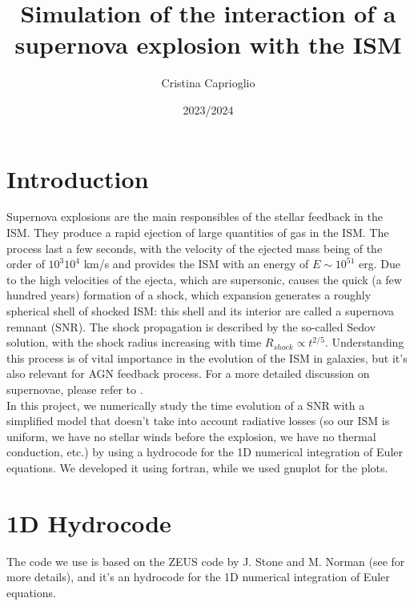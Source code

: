 \documentclass{article}
\title{Simulation of the interaction of a supernova explosion with the ISM}
\author{Cristina Caprioglio}
\date{2023/2024 }
\begin{document}
\maketitle

\section*{Introduction}
Supernova explosions are the main responsibles of the stellar feedback in the ISM. They produce a rapid ejection of large quantities of gas in the ISM. The process last a few seconds, with the velocity of the ejected mass being of the order of $10^{3}$\textemdash$10^{4}$ km/s and provides the ISM with an energy of $E\sim 10^{51}$ erg. Due to the high velocities of the ejecta, which are supersonic, causes the quick (a few hundred years) formation of a shock, which expansion generates a roughly spherical shell of shocked ISM: this shell and its interior are called a supernova remnant (SNR). 
The shock propagation is described by the so-called Sedov solution, with the shock radius increasing with time $R_{shock}\propto t^{2/5}$. Understanding this process is of vital importance in the evolution of the ISM in galaxies, but it's also relevant for AGN feedback process. 
For a more detailed discussion on supernovae, please refer to \cite[Sec. 8.7]{cimatti}.\\
In this project, we numerically study the time evolution of a SNR with a simplified model that doesn't take into account radiative losses (so our ISM is uniform,  we have no stellar winds before the explosion, we have no thermal conduction, etc.) by using a hydrocode for the 1D numerical integration of Euler equations. We developed it using fortran, while we used gnuplot for the plots.
\section{1D Hydrocode}
The code we use is based on the ZEUS code by J. Stone and M. Norman (see \cite{stone} for more details), and it's an hydrocode for the 1D numerical integration of Euler equations.
\end{document}
